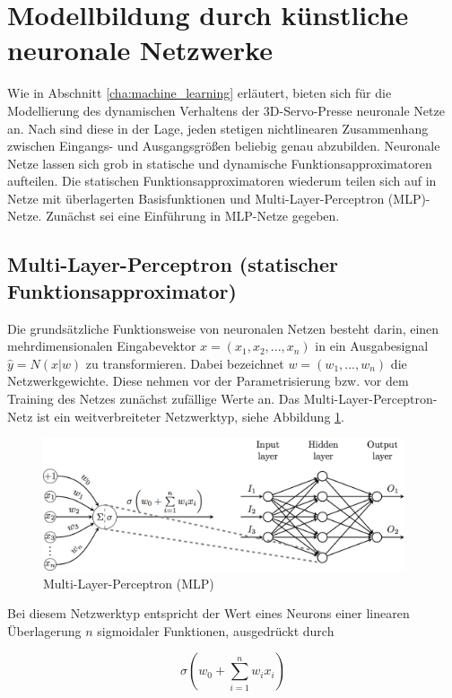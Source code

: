 \section{Modellbildung durch künstliche neuronale Netzwerke}

Wie in Abschnitt \ref{cha:machine_learning} erläutert, bieten sich für die Modellierung des dynamischen Verhaltens der 3D-Servo-Presse neuronale Netze an. Nach \cite{Lipton.5292015} sind diese in der Lage, jeden stetigen nichtlinearen Zusammenhang zwischen Eingangs- und Ausgangsgrößen beliebig genau abzubilden. Neuronale Netze lassen sich grob in statische und dynamische Funktionsapproximatoren aufteilen. Die statischen Funktionsapproximatoren wiederum teilen sich auf in Netze mit überlagerten Basisfunktionen und Multi-Layer-Perceptron (MLP)-Netze. Zunächst sei eine Einführung in MLP-Netze gegeben. 

\subsection{Multi-Layer-Perceptron (statischer Funktionsapproximator)}
\label{cha_ff}
Die grundsätzliche Funktionsweise von neuronalen Netzen besteht darin, einen mehrdimensionalen Eingabevektor $x = (x_1,x_2,...,x_n)$ in ein Ausgabesignal $\hat{y} = N(x|w)$ zu transformieren. Dabei bezeichnet $w = (w_1,...,w_n)$ die Netzwerkgewichte. Diese nehmen vor der Parametrisierung bzw. vor dem Training des Netzes zunächst zufällige Werte an. Das Multi-Layer-Perceptron-Netz ist ein weitverbreiteter Netzwerktyp, siehe Abbildung \ref{fig:mlp}. 

\begin{figure} [h]
	\centering
	\includegraphics[width=0.95\textwidth]{images/MLP}
	\caption{Multi-Layer-Perceptron (MLP) \cite{Velickovic.2018}}
	\label{fig:mlp}
\end{figure}


Bei diesem Netzwerktyp entspricht der Wert eines Neurons einer linearen Überlagerung $n$ sigmoidaler Funktionen, ausgedrückt durch 

\begin{equation} 
\label{eq:feedforward}
\sigma(w_0 + \sum_{i=1}^{n} w_i x_i)
\end{equation}

